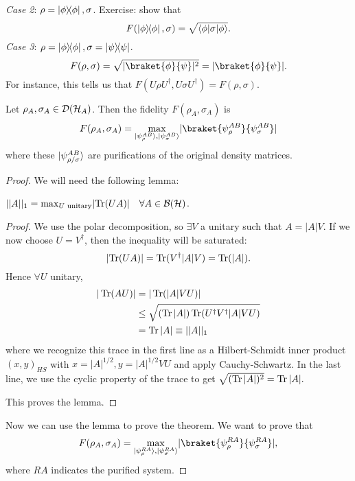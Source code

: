 \textit{Case 2}: $\rho=\left\lvert{\phi}\middle\rangle\!\middle\langle{\phi}\right\rvert,\sigma$. Exercise: show that
\begin{equation}
    F(\left\lvert{\phi}\middle\rangle\!\middle\langle{\phi}\right\rvert,\sigma)=\sqrt{\langle\phi\rvert\sigma \lvert\phi\rangle}.
\end{equation}
\textit{Case 3}: $\rho=\left\lvert{\phi}\middle\rangle\!\middle\langle{\phi}\right\rvert,\sigma = \left\lvert{\psi}\middle\rangle\!\middle\langle{\psi}\right\rvert$.
\begin{equation}
    F(\rho,\sigma)=\sqrt{\abs{\braket{\phi}{\psi}}^2} =\abs{\braket{\phi}{\psi}}.
\end{equation}
For instance, this tells us that $F(U\rho U^\dagger, U\sigma U^\dagger)=F(\rho,\sigma)$.

\begin{thm}[Uhlmann]
    Let $\rho_A, \sigma_A \in \mathcal{D}(\mathcal H_A)$. Then the fidelity $F(\rho_A,\sigma_A)$ is
    \begin{equation}
        F(\rho_A,\sigma_A) =\max_{\ket{\psi_\rho^{AB}},\ket{\psi_\sigma^{AB}}} \abs{\braket{\psi_\rho^{AB}}{\psi_\sigma^{AB}}}
    \end{equation}
    where these $\lvert\psi_{\rho/\sigma}^{AB}\rangle$ are purifications of the original density matrices.
    \begin{proof}
        We will need the following lemma:
        \begin{lem}
            $||A||_1 = \max_{U\text{ unitary}} \lvert\operatorname{Tr}(UA)\rvert \quad\forall A \in \mathcal{B}(\mathcal H)$.
        \end{lem}
        \begin{proof}
            We use the polar decomposition, so $\exists V$ a unitary such that $A=|A|V$. If we now choose $U=V^\dagger$, then the inequality will be saturated:
            \begin{equation*} 
                \lvert\operatorname{Tr}(UA)\rvert=\operatorname{Tr}(V^\dagger |A|V)=\operatorname{Tr}(|A|).
            \end{equation*}
            Hence $\forall U$ unitary,
            \begin{align*}
                |\operatorname{Tr}(AU)| &= |\operatorname{Tr}(|A|V U)|\\
                    &\leq \sqrt{(\operatorname{Tr}|A|)\operatorname{Tr}(U^\dagger V^\dagger |A| VU)}\\
                    &=\operatorname{Tr}|A|\equiv ||A||_1
            \end{align*}
            where we recognize this trace in the first line as a Hilbert-Schmidt inner product $(x,y)_{HS}$ with $x=|A|^{1/2},y=|A|^{1/2}VU$ and apply Cauchy-Schwartz. In the last line, we use the cyclic property of the trace to get $\sqrt{(\operatorname{Tr}|A|)^2}=\operatorname{Tr}|A|.$
            
            This proves the lemma.
        \end{proof}
        Now we can use the lemma to prove the theorem. We want to prove that 
        \begin{equation*}
            F(\rho_A,\sigma_A)=\max_{\ket{\psi_\rho^{RA}},\ket{\psi_\sigma^{RA}}} \abs{\braket{\psi_\rho^{RA}}{\psi_\sigma^{RA}}},
        \end{equation*}
        where $RA$ indicates the purified system.
        

\end{proof}
\end{thm}
